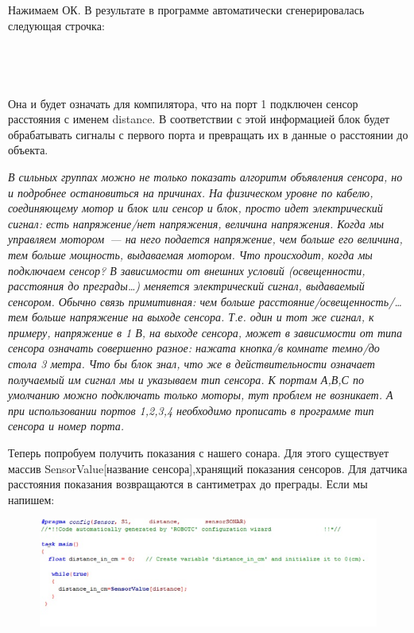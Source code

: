 Нажимаем ОК. В результате в программе автоматически сгенерировалась следующая строчка:\\\\
{\programm
	{\slshape{}}\\
}\\\\	

Она и будет означать для компилятора, что на порт 1 подключен сенсор расстояния с именем distance. В соответствии с этой информацией блок будет обрабатывать сигналы с первого порта и превращать их в данные о расстоянии до объекта.

{\slshape В сильных группах можно не только показать алгоритм объявления сенсора, но и подробнее остановиться на причинах. На физическом уровне по кабелю, соединяющему мотор и блок или сенсор и блок, просто идет электрический сигнал: есть напряжение/нет напряжения, величина напряжения. Когда мы управляем мотором~--- на него подается напряжение, чем больше его величина, тем больше мощность, выдаваемая мотором. Что происходит, когда мы подключаем сенсор? В зависимости от внешних условий (освещенности, расстояния до преграды\dots) меняется электрический сигнал, выдаваемый сенсором. Обычно связь примитивная: чем больше расстояние/освещенность/\dots тем больше напряжение на выходе сенсора. Т.е. один и тот же сигнал, к примеру, напряжение в 1 В, на выходе сенсора, может в зависимости от типа сенсора означать совершенно разное: нажата кнопка/в комнате темно/до стола 3 метра. Что бы блок знал, что же в действительности означает получаемый им сигнал мы и указываем тип сенсора. К портам А,В,С по умолчанию можно подключать только моторы, тут проблем не возникает. А при использовании портов 1,2,3,4 необходимо прописать в программе тип сенсора и номер порта.}

Теперь попробуем получить показания с нашего сонара. Для этого существует массив SensorValue[название сенсора],хранящий показания сенсоров. Для датчика расстояния показания возвращаются в сантиметрах до преграды. Если мы напишем: 

\begin{figure}[h!]
	\begin{center}
		\includegraphics[width=1\linewidth]{chapters/chapter14/images/3}
		\caption{}
		\label{ris:image14x3}
	\end{center}
\end{figure}	

